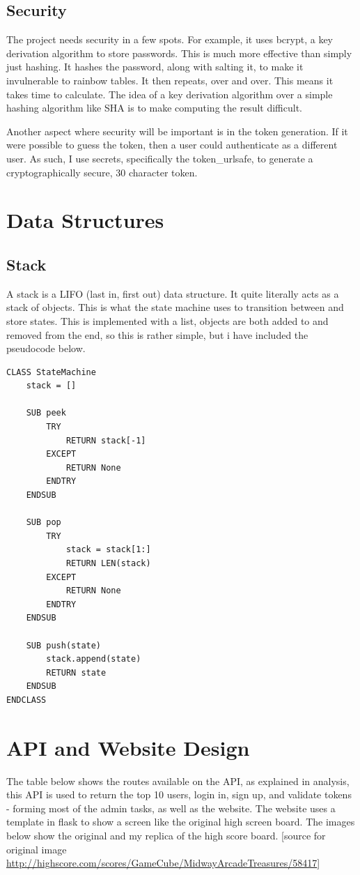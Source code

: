 \subsection{Security}
The project needs security in a few spots. For example, it uses bcrypt, a key derivation algorithm to store passwords. This is much more effective than simply just hashing. It hashes the password, along with salting it, to make it invulnerable to rainbow tables. It then repeats, over and over. This means it takes time to calculate. The idea of a key derivation algorithm over a simple hashing algorithm like SHA is to make computing the result difficult. 

Another aspect where security will be important is in the token generation. If it were possible to guess the token, then a user could authenticate as a different user. As such, I use secrets, specifically the token\_urlsafe, to generate a cryptographically secure, 30 character token. 
\section{Data Structures}
\subsection{Stack}
A stack is a LIFO (last in, first out) data structure. It quite literally acts as a stack of objects. This is what the state machine uses to transition between and store states. This is implemented with a list, objects are both added to and removed from the end, so this is rather simple, but i have included the pseudocode below. 

\begin{lstlisting}
CLASS StateMachine
    stack = []
    
    SUB peek
        TRY
            RETURN stack[-1]
        EXCEPT
            RETURN None
        ENDTRY
    ENDSUB
    
    SUB pop
        TRY
            stack = stack[1:]
            RETURN LEN(stack)
        EXCEPT
            RETURN None
        ENDTRY
    ENDSUB
    
    SUB push(state)
        stack.append(state)
        RETURN state
    ENDSUB
ENDCLASS
\end{lstlisting}
\section{API and Website Design}
The table below shows the routes available on the API, as explained in analysis, this API is used to return the top 10 users, login in, sign up, and validate tokens - forming most of the admin tasks, as well as the website. The website uses a template in flask to show a screen like the original high screen board. The images below show the original and my replica of the high score board. [source for original image \url{http://highscore.com/scores/GameCube/MidwayArcadeTreasures/58417}]

